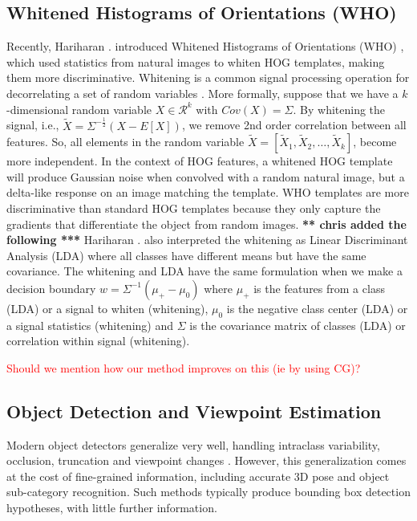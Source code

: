 \documentclass[10pt,twocolumn,letterpaper]{article}
\newcommand{\scream}[1]{{\color{red} \bf *** #1 ***}}
\begin{document}
\subsection{Whitened Histograms of Orientations (WHO)}
Recently, Hariharan \etal. introduced Whitened Histograms of Orientations (WHO) \cite{Hariharan12}, which used statistics from natural images to whiten HOG templates, making them more discriminative. Whitening is a common signal processing operation for decorrelating a set of random variables \cite{Martinsson05, Belouchrani00}. More formally, suppose that we have a $k$-dimensional random variable $X \in \mathcal{R}^k$ with $Cov(X)=\Sigma$. By whitening the signal, i.e., $\tilde{X}=\Sigma^{-\frac{1}{2}}(X - E[X])$, we remove 2nd order correlation between all features. So, all elements in the random variable $\tilde{X} = \left[\tilde{X}_1, \tilde{X}_2, \dots, \tilde{X}_k\right]$, become more independent. In the context of HOG features, a whitened HOG template will produce Gaussian noise when convolved with a random natural image, but a delta-like response on an image matching the template. WHO templates are more discriminative than standard HOG templates because they only capture the gradients that differentiate the object from random images. \scream{chris added the following} Hariharan \etal. also interpreted the whitening as Linear Discriminant Analysis (LDA) where all classes have different means but have the same covariance. The whitening and LDA have the same formulation when we make a decision boundary $w = \Sigma^{-1}(\mu_+ - \mu_0)$ where $\mu_+$ is the features from a class (LDA) or a signal to whiten (whitening), $\mu_0$ is the negative class center (LDA) or a signal statistics (whitening) and $\Sigma$ is the covariance matrix of classes (LDA) or correlation within signal (whitening).

\textcolor{red}{Should we mention how our method improves on this (ie by using CG)?}


\subsection{Object Detection and Viewpoint Estimation}

Modern object detectors generalize very well, handling intraclass variability, occlusion, truncation and viewpoint changes \cite{Felzenszwalb10, Girshick14}. However, this generalization comes at the cost of fine-grained information, including accurate 3D pose and object sub-category recognition. Such methods typically produce bounding box detection hypotheses, with little further information.
\end{document}
